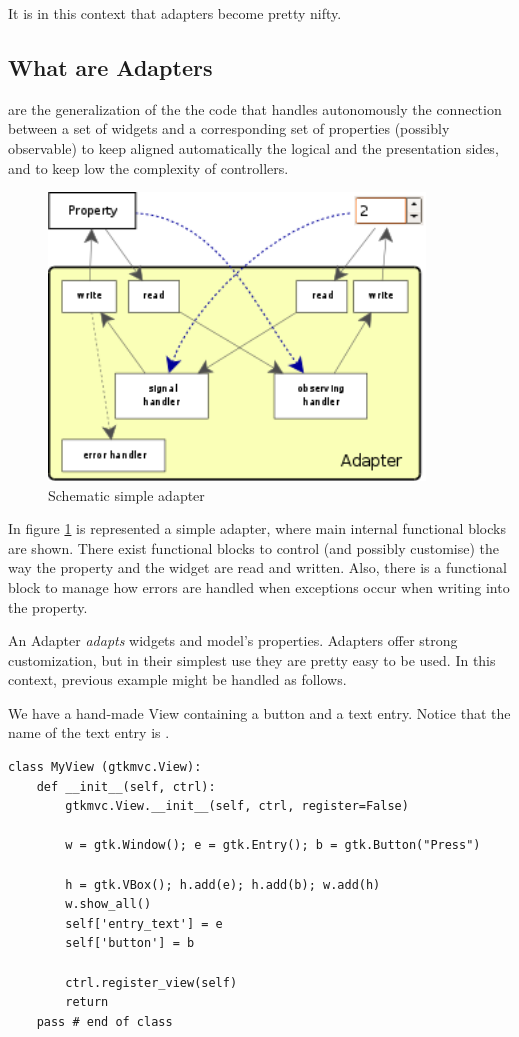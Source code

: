 \smallskip
It is in this context that adapters become pretty nifty. 

\subsection{What are Adapters}

 are the generalization of the the code that handles
autonomously the connection between a set of widgets and a
corresponding set of properties (possibly observable) to keep
aligned automatically the logical and the presentation sides, and to
keep low the complexity of controllers.

\begin{figure}[htbp]
\begin{center}
\includegraphics[width=10cm]{figs/png/adap}
\caption{\label{ADAP_f} Schematic simple adapter}
\end{center}
\end{figure}

In figure \ref{ADAP_f} is represented a simple adapter, where main
internal functional blocks are shown. There exist functional blocks
to control (and possibly customise) the way the property and the
widget are read and written. Also, there is a functional block to
manage how errors are handled when exceptions occur when writing
into the property.

An Adapter \emph{adapts} widgets and model's properties. Adapters
offer strong customization, but in their simplest use they are
pretty easy to be used. In this context, previous example might be
handled as follows.

We have a hand-made View containing a button and a text
entry. Notice that the name of the text entry is
.

{ \codesize
\begin{verbatim}
class MyView (gtkmvc.View):
    def __init__(self, ctrl):
        gtkmvc.View.__init__(self, ctrl, register=False)

        w = gtk.Window(); e = gtk.Entry(); b = gtk.Button("Press")

        h = gtk.VBox(); h.add(e); h.add(b); w.add(h)
        w.show_all()
        self['entry_text'] = e
        self['button'] = b
        
        ctrl.register_view(self)
        return
    pass # end of class
\end{verbatim}
}


